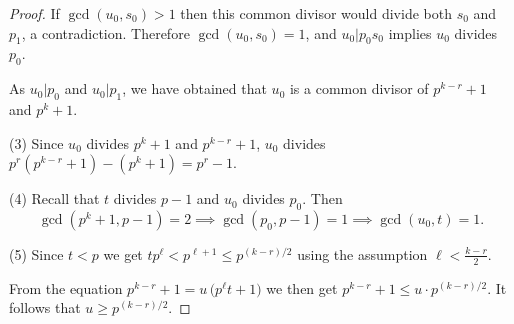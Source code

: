 \documentclass[10pt,a4paper]{amsart}
\begin{document}
\begin{proof}
If $\gcd(u_0,s_0)>1$ then this common divisor would divide 
both $s_0$ and $p_1$, a contradiction.
Therefore $\gcd(u_0,s_0)=1$, and $u_0 | p_0 s_0$ implies $u_0$ divides $p_0$.

As $u_0|p_0$ and $u_0|p_1$, we have obtained that $u_0$ is a common divisor of $p^{k-r}+1$ and $p^k+1$.  

(3) \quad  Since $u_0$ divides $p^k+1$ and $p^{k-r}+1$,
$u_0$ divides $p^r(p^{k-r}+1)-(p^k+1)=p^r-1$.

(4) \quad Recall that $t$ divides $p-1$ and $u_0$ divides $p_0$.
Then
\[
\gcd(p^k+1,p-1)=2 
\implies \gcd(p_0,p-1)=1 
\implies \gcd(u_0,t)=1.
\]


(5) \quad Since $t<p$ we get $tp^\ell < p^{\ell +1} \le p^{(k-r)/2}$
using the assumption $\ell < \frac{k-r}{2}$.

From the equation $p^{k-r}+1 = u\,\bigl(p^\ell t+1\bigr)$
we then get $p^{k-r}+1 \le u \cdot p^{(k-r)/2}$.
It follows that $u \ge p^{(k-r)/2}$.
\end{proof}
\end{document}
